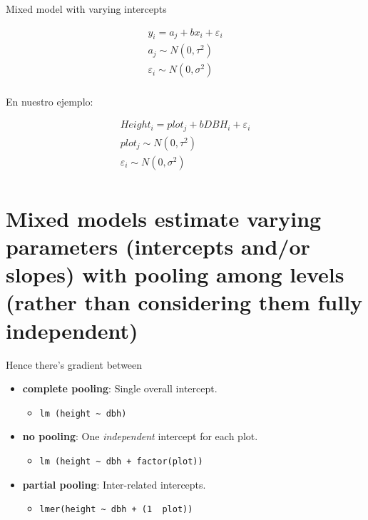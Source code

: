 \documentclass[10pt,ignorenonframetext,]{beamer}
\providecommand{\tightlist}{%
\setlength{\itemsep}{0pt}\setlength{\parskip}{0pt}}
\begin{document}
\begin{frame}{Mixed model with varying intercepts}

\[
  \begin{aligned}  
  y_{i}=a_{j}+bx_{i}+\varepsilon _{i} \\  
  a_{j} \sim N\left( 0,\tau^2 \right) \\  
  \varepsilon _{i}\sim N\left( 0,\sigma^2 \right) \\  
  \end{aligned}  
\]

En nuestro ejemplo:

\[
  \begin{aligned}  
  Height_{i}=plot_{j}+bDBH_{i}+\varepsilon _{i} \\  
  plot_{j} \sim N\left( 0,\tau^2 \right) \\  
  \varepsilon _{i}\sim N\left( 0,\sigma^2 \right) \\  
  \end{aligned}  
\]

\end{frame}

\section{Mixed models estimate varying parameters (intercepts and/or
slopes) with pooling among levels (rather than considering them fully
independent)}\label{mixed-models-estimate-varying-parameters-intercepts-andor-slopes-with-pooling-among-levels-rather-than-considering-them-fully-independent}

\begin{frame}[fragile]{Hence there's gradient between}

\begin{itemize}[<+->]
\tightlist
\item
  \textbf{complete pooling}: Single overall intercept.

  \begin{itemize}[<+->]
  \tightlist
  \item
    \texttt{lm\ (height\ \textasciitilde{}\ dbh)}
  \end{itemize}
\item
  \textbf{no pooling}: One \emph{independent} intercept for each plot.

  \begin{itemize}[<+->]
  \tightlist
  \item
    \texttt{lm\ (height\ \textasciitilde{}\ dbh\ +\ factor(plot))}
  \end{itemize}
\item
  \textbf{partial pooling}: Inter-related intercepts.

  \begin{itemize}[<+->]
  \tightlist
  \item
    \texttt{lmer(height\ \textasciitilde{}\ dbh\ +\ (1\ \textbar{}\ plot))}
  \end{itemize}
\end{itemize}

\end{frame}
\end{document}

